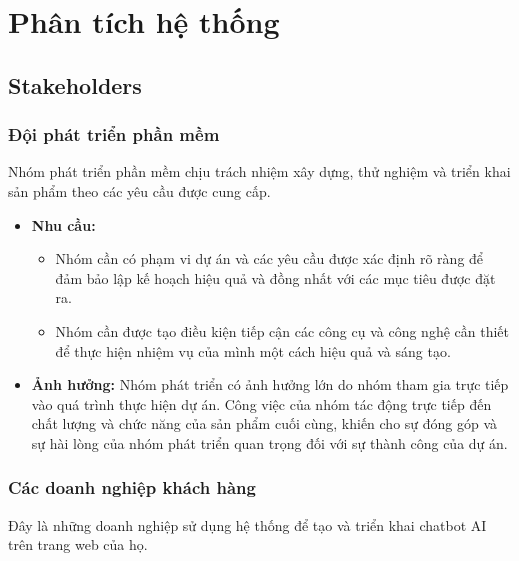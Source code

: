 \section{Phân tích hệ thống}
\subsection{Stakeholders}
\subsubsection{Đội phát triển phần mềm}

Nhóm phát triển phần mềm chịu trách nhiệm xây dựng, thử nghiệm và triển khai sản phẩm theo các yêu cầu được cung cấp.

\begin{itemize}
    \item \textbf{Nhu cầu:}
    \begin{itemize}
        \item Nhóm cần có phạm vi dự án và các yêu cầu được xác định rõ ràng để đảm bảo lập kế hoạch hiệu quả và đồng nhất với các mục tiêu được đặt ra.
        \item Nhóm cần được tạo điều kiện tiếp cận các công cụ và công nghệ cần thiết để thực hiện nhiệm vụ của mình một cách hiệu quả và sáng tạo.
    \end{itemize}
    \item \textbf{Ảnh hưởng:} Nhóm phát triển có ảnh hưởng lớn do nhóm tham gia trực tiếp vào quá trình thực hiện dự án. Công việc của nhóm tác động trực tiếp đến chất lượng và chức năng của sản phẩm cuối cùng, khiến cho sự đóng góp và sự hài lòng của nhóm phát triển quan trọng đối với sự thành công của dự án.
\end{itemize}

\subsubsection{Các doanh nghiệp khách hàng}

Đây là những doanh nghiệp sử dụng hệ thống để tạo và triển khai chatbot AI trên trang web của họ.

